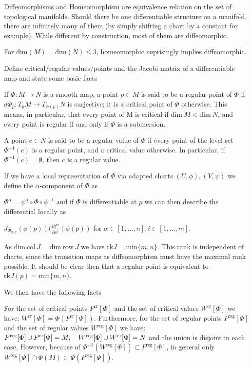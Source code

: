 Diffeomorphisms and Homeomorphism are equivalence relation on the set of topological manifolds.
Should there be one differentiable structure on a manifold, there are infinitely many of them
(by simply shifting a chart by a constant for example). While different by construction, most of them are diffeomorphic. 

For \( \text{dim}(M) = \text{dim}(N) \leq 3 \), homeomorphic suprisingly implies diffeomorphic.



Define critical/regular values/points and the Jacobi matrix of a differentiable map and state some basic facts

If \( \Phi : M \to N \) is a
smooth map, a point \( p \in M \) is said to be a regular point of \( \Phi \) if \( d\Phi_p : T_p M \to T_{\phi(p)}N \)
is surjective; it is a critical point of \( \Phi \) otherwise. This means, in particular,
that every point of M is critical if \( \text{dim}\ M < \text{dim}\ N \), and every point is regular if and
only if \( \Phi \) is a submersion. 

A point \( c \in N \) is said to be a regular value of \( \Phi \) if
every point of the level set \( \Phi^{-1}(c) \) is a regular point, and a critical value otherwise.
In particular, if \( \Phi^{-1}(c) = \emptyset \), then \( c \) is a regular value.

If we have a local representation of \( \Phi \) via adapted charts \( (U, \phi), (V, \psi) \)
we define the \( \alpha \)-component of \( \Phi \) as

\( \Phi^{\alpha} = \psi^{\alpha} \circ \Phi \circ \phi^{-1} \)
and if \( \Phi \) is differentiable at \( p \) we can then describe the differential locally as

\( J_{\Phi_{\phi,\psi}}(\phi(p))(\frac{\partial f^{\alpha}}{\partial \phi^i}(\phi(p)) \)
for \( \alpha \in [1, \dots, n], i \in [1, \dots, m] \).

As \( \text{dim}\ \text{col}\ J = \text{dim}\ \text{row}\ J\) we have \( \text{rk} J = \text{min}\{m, n\} \).
This rank is independent of charts, since the transition maps as diffeomorphism must have the maximal rank
possible.
It should be clear then that a regular point is equivalent to
\( \text{rk} J(p) = \text{min}\{m, n\} \).

We then have the following facts 

For the set of critical points \(P^{\text{cr}}[\Phi]\) and the set of critical values \(W^{\text{cr}}[\Phi]\) we have:
\(W^{\text{cr}}[\Phi] = \Phi(P^\text{{cr}}[\Phi]).\)
Furthermore, for the set of regular points \(P^{\text{reg}}[\Phi]\) and the set of regular values \(W^{\text{reg}}[\Phi]\) we have:
\(P^{\text{reg}}[\Phi] \cup P^{\text{cr}}[\Phi] = M, \quad W^{\text{\text{reg}}}[\Phi] \cup W^{\text{cr}}[\Phi] = N\)
and the union is disjoint in each case. However, because of \(\Phi^{-1}(W^{\text{reg}}[\Phi]) \subset P^{\text{reg}}[\Phi]\), in general only
\(W^{\text{reg}}[\Phi] \cap \Phi(M) \subset \Phi(P^{\text{reg}}[\Phi]).\)

